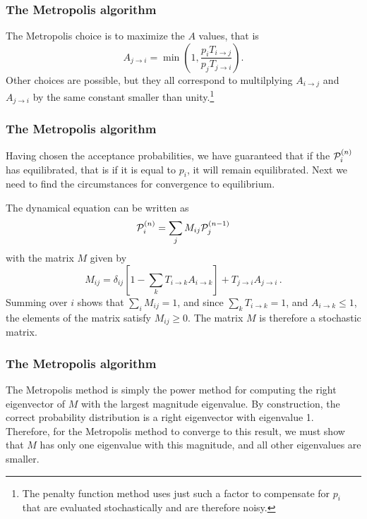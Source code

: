 \documentclass{beamer}
\begin{document}
\begin{frame}
\frametitle{The Metropolis algorithm}

\begin{block}{}
The Metropolis choice is to maximize the $A$ values, that is
\[
A_{j \rightarrow i} = \min \left ( 1,
\frac{p_iT_{i\rightarrow j}}{ p_jT_{j\rightarrow i}}\right ).
\]
Other choices are possible, but they all correspond to multilplying
$A_{i\rightarrow j}$ and $A_{j\rightarrow i}$ by the same constant
smaller than unity.\footnote{The penalty function method uses just such
a factor to compensate for $p_i$ that are evaluated stochastically
and are therefore noisy.}
\end{block}
\end{frame}

\begin{frame}
\frametitle{The Metropolis algorithm}

\begin{block}{}
Having chosen the acceptance probabilities, we have guaranteed that
if the  ${\cal P}_i^{(n)}$ has equilibrated, that is if it is equal to $p_i$,
it will remain equilibrated. Next we need to find the circumstances for
convergence to equilibrium.

The dynamical equation can be written as
\[
{\cal P}^{(n)}_i = \sum_j M_{ij}{\cal P}^{(n-1)}_j
\]
with the matrix $M$ given by
\[
M_{ij} = \delta_{ij}\left [ 1 -\sum_k T_{i\rightarrow k} A_{i \rightarrow k}
\right ] + T_{j\rightarrow i} A_{j\rightarrow i} \,.
\]
Summing over $i$ shows that $\sum_i M_{ij} = 1$, and since
$\sum_k T_{i\rightarrow k} = 1$, and $A_{i \rightarrow k} \leq 1$, the
elements of the matrix satisfy $M_{ij} \geq 0$. The matrix $M$ is therefore
a stochastic matrix.

\end{block}
\end{frame}

\begin{frame}
\frametitle{The Metropolis algorithm}

\begin{block}{}
The Metropolis method is simply the power method for computing the
right eigenvector of $M$ with the largest magnitude eigenvalue.
By construction, the correct probability distribution is a right eigenvector
with eigenvalue 1. Therefore, for the Metropolis method to converge
to this result, we must show that $M$ has only one eigenvalue with this
magnitude, and all other eigenvalues are smaller.

\end{block}
\end{frame}
\end{document}
